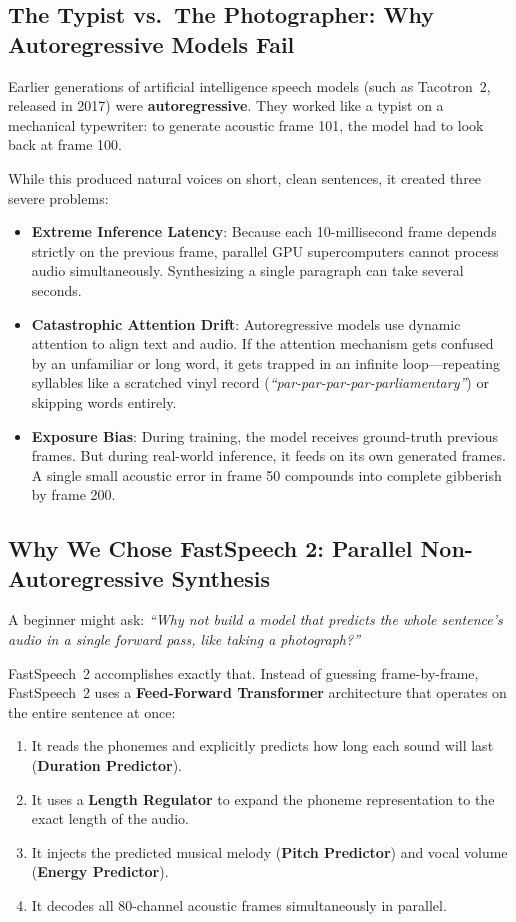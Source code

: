 \documentclass[11pt,a4paper]{article}
\begin{document}
\subsection{The Typist vs.\ The Photographer: Why Autoregressive Models Fail}
Earlier generations of artificial intelligence speech models (such as Tacotron~2, released in 2017) were \textbf{autoregressive}. They worked like a typist on a mechanical typewriter: to generate acoustic frame 101, the model had to look back at frame 100.

While this produced natural voices on short, clean sentences, it created three severe problems:
\begin{itemize}
  \item \textbf{Extreme Inference Latency}: Because each 10-millisecond frame depends strictly on the previous frame, parallel GPU supercomputers cannot process audio simultaneously. Synthesizing a single paragraph can take several seconds.
  \item \textbf{Catastrophic Attention Drift}: Autoregressive models use dynamic attention to align text and audio. If the attention mechanism gets confused by an unfamiliar or long word, it gets trapped in an infinite loop---repeating syllables like a scratched vinyl record (\textit{``par-par-par-par-parliamentary''}) or skipping words entirely.
  \item \textbf{Exposure Bias}: During training, the model receives ground-truth previous frames. But during real-world inference, it feeds on its own generated frames. A single small acoustic error in frame 50 compounds into complete gibberish by frame 200.
\end{itemize}

\subsection{Why We Chose FastSpeech 2: Parallel Non-Autoregressive Synthesis}
A beginner might ask: \textit{``Why not build a model that predicts the whole sentence's audio in a single forward pass, like taking a photograph?''}

FastSpeech~2 accomplishes exactly that. Instead of guessing frame-by-frame, FastSpeech~2 uses a \textbf{Feed-Forward Transformer} architecture that operates on the entire sentence at once:
\begin{enumerate}
  \item It reads the phonemes and explicitly predicts how long each sound will last (\textbf{Duration Predictor}).
  \item It uses a \textbf{Length Regulator} to expand the phoneme representation to the exact length of the audio.
  \item It injects the predicted musical melody (\textbf{Pitch Predictor}) and vocal volume (\textbf{Energy Predictor}).
  \item It decodes all 80-channel acoustic frames simultaneously in parallel.
\end{enumerate}
\end{document}
